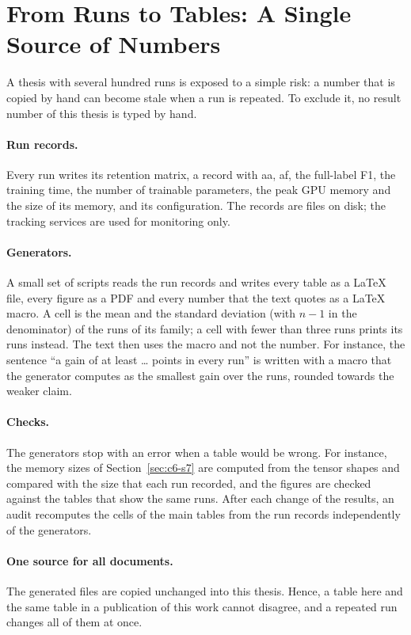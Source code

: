 \section{From Runs to Tables: A Single Source of Numbers}
\label{sec:c4-s3}

A thesis with several hundred runs is exposed to a simple risk: a number that is copied by
hand can become stale when a run is repeated. To exclude it, no result number of this
thesis is typed by hand.

\paragraph{Run records.} Every run writes its retention matrix, a record with \gls{aa},
\gls{af}, the full-label F1, the training time, the number of trainable parameters, the
peak GPU memory and the size of its memory, and its configuration. The records are files
on disk; the tracking services are used for monitoring only.

\paragraph{Generators.} A small set of scripts reads the run records and writes every
table as a LaTeX file, every figure as a PDF and every number that the text quotes as a
LaTeX macro. A cell is the mean and the standard deviation (with $n{-}1$ in the
denominator) of the runs of its family; a cell with fewer than three runs prints its runs
instead. The text then uses the macro and not the number. For instance, the sentence ``a
gain of at least \dots{} points in every run'' is written with a macro that the generator
computes as the smallest gain over the runs, rounded towards the weaker claim.

\paragraph{Checks.} The generators stop with an error when a table would be wrong. For
instance, the memory sizes of Section~\ref{sec:c6-s7} are computed from the tensor shapes
and compared with the size that each run recorded, and the figures are checked against
the tables that show the same runs. After each change of the results, an audit
recomputes the cells of the main tables from the run records independently of the
generators.

\paragraph{One source for all documents.} The generated files are copied unchanged into
this thesis. Hence, a table here and the same table in a publication of this work cannot
disagree, and a repeated run changes all of them at once.


